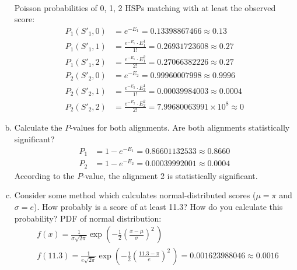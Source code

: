 \documentclass{article}
\begin{document}
\begin{flushleft}
\begin{enumerate}[(a)]
\begin{align*}
    \end{align*}
    Poisson probabilities of 0, 1, 2 HSPs matching with at least the observed score:
    \begin{align*}
        P_1(S'_1,0) &= e^{-E_1} = 0.13398867466 \approx 0.13 \\
        P_1(S'_1,1) &= \frac{e^{-E_1} \cdot E_1 ^ 1}{1!} = 0.26931723608 \approx 0.27 \\
        P_1(S'_1,2) &= \frac{e^{-E_1} \cdot E_1 ^ 2}{2!} = 0.27066382226 \approx 0.27 \\
        P_2(S'_2,0) &= e^{-E_2} = 0.99960007998 \approx 0.9996 \\
        P_2(S'_2,1) &= \frac{e^{-E_2} \cdot E_2 ^ 1}{1!} = 0.00039984003 \approx 0.0004\\
        P_2(S'_2,2) &= \frac{e^{-E_2} \cdot E_2 ^ 2}{2!} = 7.99680063991 \times 10^8 \approx 0
    \end{align*}
    \item Calculate the $P$-values for both alignments. Are both alignments statistically significant?
    \newline
    \begin{align*}
        P_1 &= 1 - e^{-E_1} = 0.86601132533 \approx 0.8660 \\
        P_2 &= 1 - e^{-E_2} = 0.00039992001 \approx 0.0004
    \end{align*}
    \newline
    According to the $P$-value, the alignment 2 is statistically significant.
    \item Consider some method which calculates normal-distributed scores ($\mu = \pi $ and $\sigma = e$). How
    probably is a score of at least 11.3? How do you calculate this probability?
    \newline
    PDF of normal distribution:
    \begin{align*}
        &f(x) = \frac{1}{\sigma\sqrt{2\pi}} 
        \exp\left( -\frac{1}{2}\left(\frac{x-\mu}{\sigma}\right)^{\!2}\,\right) \\
        &f(11.3) = \frac{1}{e\sqrt{2\pi}} 
        \exp\left( -\frac{1}{2}\left(\frac{11.3 - \pi}{e}\right)^{\!2}\,\right) = 0.001623988046 \approx 0.0016
    \end{align*}
\end{enumerate}
\end{flushleft}
\end{document}
